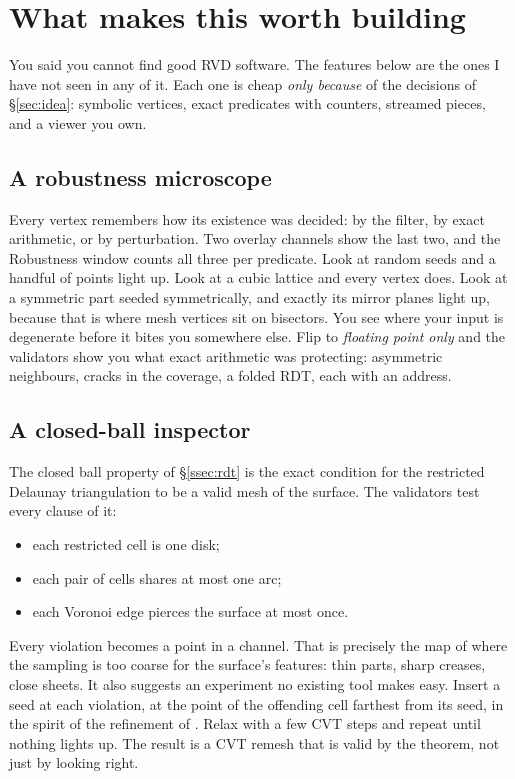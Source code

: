 \documentclass[11pt,a4paper]{article}
\newcommand{\secref}[1]{\S\ref{#1}}
\begin{document}
\section{What makes this worth building}\label{sec:interesting}

You said you cannot find good RVD software. The features below are the ones I have not seen in
any of it. Each one is cheap \emph{only because} of the decisions of \secref{sec:idea}: symbolic
vertices, exact predicates with counters, streamed pieces, and a viewer you own.

\subsection{A robustness microscope}\label{ssec:microscope}

Every vertex remembers how its existence was decided: by the filter, by exact arithmetic, or by
perturbation. Two overlay channels show the last two, and the Robustness window counts all three
per predicate. Look at random seeds and a handful of points light up. Look at a cubic lattice and
every vertex does. Look at a symmetric part seeded symmetrically, and exactly its mirror planes
light up, because that is where mesh vertices sit on bisectors. You see where your input is
degenerate before it bites you somewhere else. Flip to \emph{floating point only} and the
validators show you what exact arithmetic was protecting: asymmetric neighbours, cracks in the
coverage, a folded RDT, each with an address.

\subsection{A closed-ball inspector}\label{ssec:closedball}

The closed ball property of \secref{ssec:rdt} is the exact condition for the restricted Delaunay
triangulation to be a valid mesh of the surface. The validators test every clause of it:

\begin{itemize}
\item each restricted cell is one disk;
\item each pair of cells shares at most one arc;
\item each Voronoi edge pierces the surface at most once.
\end{itemize}

Every violation becomes a point in a channel. That is precisely the map of where the sampling is
too coarse for the surface's features: thin parts, sharp creases, close sheets. It also suggests
an experiment no existing tool makes easy. Insert a seed at each violation, at the point of the
offending cell farthest from its seed, in the spirit of the refinement of
\citet{boissonnat2005}. Relax with a few CVT steps and repeat until nothing lights up. The result
is a CVT remesh that is valid by the theorem, not just by looking right.
\end{document}
